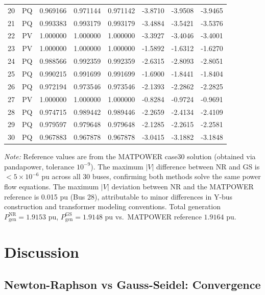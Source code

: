 \documentclass[12pt,a4paper]{article}
\begin{document}
\begin{table}[H]
\begin{tabular}{cccccccc}
20 & PQ    & 0.969166 & 0.971144 & 0.971142 & -3.8710 & -3.9508 & -3.9465 \\
21 & PQ    & 0.993383 & 0.993179 & 0.993179 & -3.4884 & -3.5421 & -3.5376 \\
22 & PV    & 1.000000 & 1.000000 & 1.000000 & -3.3927 & -3.4046 & -3.4001 \\
23 & PV    & 1.000000 & 1.000000 & 1.000000 & -1.5892 & -1.6312 & -1.6270 \\
24 & PQ    & 0.988566 & 0.992359 & 0.992359 & -2.6315 & -2.8093 & -2.8051 \\
25 & PQ    & 0.990215 & 0.991699 & 0.991699 & -1.6900 & -1.8441 & -1.8404 \\
26 & PQ    & 0.972194 & 0.973546 & 0.973546 & -2.1393 & -2.2862 & -2.2825 \\
27 & PV    & 1.000000 & 1.000000 & 1.000000 & -0.8284 & -0.9724 & -0.9691 \\
28 & PQ    & 0.974715 & 0.989442 & 0.989446 & -2.2659 & -2.4134 & -2.4109 \\
29 & PQ    & 0.979597 & 0.979648 & 0.979648 & -2.1285 & -2.2615 & -2.2581 \\
30 & PQ    & 0.967883 & 0.967878 & 0.967878 & -3.0415 & -3.1882 & -3.1848 \\
\bottomrule
\end{tabular}
\end{table}

\begin{flushleft}
\footnotesize
\textit{Note:} Reference values are from the MATPOWER case30 solution (obtained via pandapower, tolerance $10^{-9}$). The maximum $|V|$ difference between NR and GS is $<5\times10^{-6}$ pu across all 30 buses, confirming both methods solve the same power flow equations. The maximum $|V|$ deviation between NR and the MATPOWER reference is 0.015 pu (Bus 28), attributable to minor differences in Y-bus construction and transformer modeling conventions. Total generation $P_{\text{gen}}^{\text{NR}} = 1.9153$ pu, $P_{\text{gen}}^{\text{GS}} = 1.9148$ pu vs.\ MATPOWER reference $1.9164$ pu.
\end{flushleft}

\section{Discussion}

\subsection{Newton-Raphson vs Gauss-Seidel: Convergence}
\end{document}
